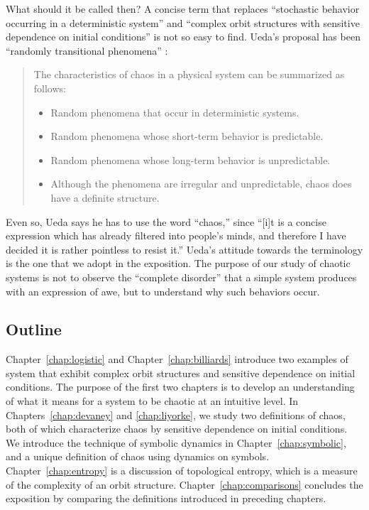 \documentclass[10pt,twoside,draft]{book}
\begin{document}
What should it be called then?
A concise term that replaces ``stochastic behavior occurring in a deterministic system'' and ``complex orbit structures with sensitive dependence on initial conditions'' is not so easy to find.
Ueda's proposal has been ``randomly transitional phenomena'' \citep[p.24]{ueda-abraham}:
\begin{quotation}
  The characteristics of chaos in a physical system can be summarized as follows:
  \begin{itemize}
    \item Random phenomena that occur in deterministic systems.
    \item Random phenomena whose short-term behavior is predictable.
    \item Random phenomena whose long-term behavior is unpredictable.
    \item Although the phenomena are irregular and unpredictable, chaos does have a definite structure.
  \end{itemize}
\end{quotation}
Even so, Ueda says he has to use the word ``chaos,'' since ``[i]t is a concise expression which has already filtered into people's minds, and therefore I have decided it is rather pointless to resist it.''
Ueda's attitude towards the terminology is the one that we adopt in the exposition.
The purpose of our study of chaotic systems is not to observe the ``complete disorder'' that a simple system produces with an expression of awe, but to understand why such behaviors occur.

\subsection*{Outline}
Chapter~\ref{chap:logistic} and Chapter~\ref{chap:billiards} introduce two examples of system that exhibit complex orbit structures and sensitive dependence on initial conditions.
The purpose of the first two chapters is to develop an understanding of what it means for a system to be chaotic at an intuitive level.
In Chapters~\ref{chap:devaney} and \ref{chap:liyorke}, we study two definitions of chaos, both of which characterize chaos by sensitive dependence on initial conditions.
We introduce the technique of symbolic dynamics in Chapter~\ref{chap:symbolic}, and a unique definition of chaos using dynamics on symbols.
Chapter~\ref{chap:entropy} is a discussion of topological entropy, which is a measure of the complexity of an orbit structure. 
Chapter~\ref{chap:comparisons} concludes the exposition by comparing the definitions introduced in preceding chapters.
\end{document}
